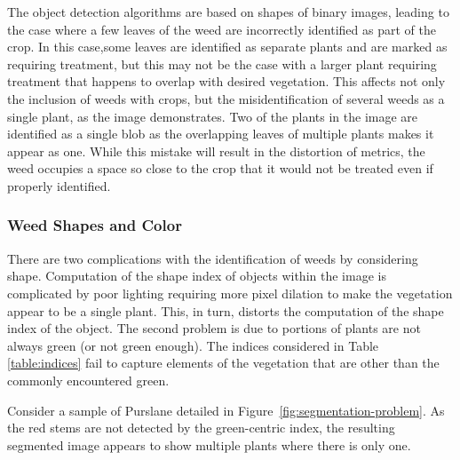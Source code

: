 \documentclass[letterpaper]{report}
\begin{document}
The object detection algorithms are based on shapes of binary images, leading to the case where a few leaves of the weed are incorrectly identified as part of the crop. In this case,some leaves are identified as separate plants and are marked as requiring treatment, but this may not be the case with a larger plant requiring treatment that happens to overlap with desired vegetation. This affects not only the inclusion of weeds with crops, but the misidentification of several weeds as a single plant, as the image demonstrates.  Two of the plants in the image are identified as a single blob as the overlapping leaves of multiple plants makes it appear as one. While this mistake will result in the distortion of metrics, the weed occupies a space so close to the crop that it would not be treated even if properly identified.

\subsubsection{Weed Shapes and Color}
There are two complications with the identification of weeds by considering shape.  Computation of the shape index of objects within the image is complicated by poor lighting requiring more pixel dilation to make the vegetation appear to be a single plant. This, in turn, distorts the computation of the shape index of the object. The second problem is due to portions of plants are not always green (or not green enough). The indices considered in Table \ref{table:indices} fail to capture elements of the vegetation that are other than the commonly encountered green.

Consider a sample of Purslane detailed in Figure~\ref{fig:segmentation-problem}. As the red stems are not detected by the green-centric index, the resulting segmented image appears to show multiple plants where there is only one.
\end{document}
